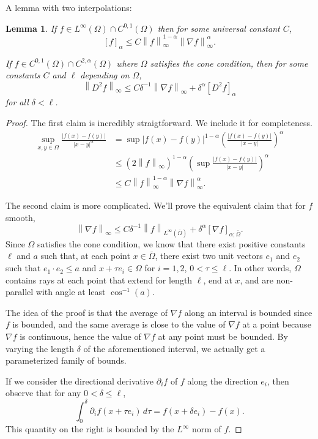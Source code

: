 \documentclass[11pt]{amsart}
\newtheorem{lemma}[theorem]{Lemma}
\theoremstyle{remark}
\theoremstyle{definition}
\newcommand{\norm}[1]{\left\lVert#1\right\rVert}
\newcommand{\paren}[1]{\left( #1 \right)}
\newcommand{\bracket}[1]{\left[ #1 \right]}
\newcommand{\del}{\partial}
\newcommand{\grad}{\nabla}
\newcommand{\n}{^{-1}}
\begin{document}
A lemma with two interpolations:
\begin{lemma} \label{thm:Holder interpolation}
If $f \in L^\infty(\Omega) \cap C^{0,1}(\Omega)$ then for some universal constant $C$,
\[ \bracket{f}_\alpha \leq C \norm{f}_\infty^{1-\alpha} \norm{\grad f}_\infty^\alpha. \]

If $f \in C^{0,1}(\Omega) \cap C^{2,\alpha}(\Omega)$ where $\Omega$ satisfies the cone condition, then for some constants $C$ and $\ell$ depending on $\Omega$,
\[ \norm{D^2 f}_\infty \leq C \delta\n \norm{\grad f}_\infty  + \delta^\alpha \bracket{D^2 f}_\alpha\]
for all $\delta < \ell$.  
\end{lemma}
\begin{proof}
The first claim is incredibly straigtforward.  We include it for completeness.  
\begin{align*} 
\sup_{x,y \in \Omega} \frac{|f(x)-f(y)|}{|x-y|^\alpha} &= \sup |f(x)-f(y)|^{1-\alpha} \paren{\frac{|f(x)-f(y)|}{|x-y|}}^\alpha 
\\ &\leq \paren{2 \norm{f}_\infty}^{1-\alpha} \paren{ \sup \frac{|f(x)-f(y)|}{|x-y|} }^\alpha
\\ &\leq C \norm{f}_\infty^{1-\alpha} \norm{\grad f}_\infty^\alpha.
\end{align*}

The second claim is more complicated.  We'll prove the equivalent claim that for $f$ smooth,
\[ \norm{\grad f}_\infty \leq C \delta\n \norm{f}_{L^\infty(\bar{\Omega})} + \delta^\alpha \bracket{\grad f}_{\alpha;\bar{\Omega}}.\]
Since $\Omega$ satisfies the cone condition, we know that there exist positive constants $\ell$ and $a$ such that, at each point $x \in \bar{\Omega}$, there exist two unit vectors $e_1$ and $e_2$ such that $e_1\cdot e_2 \leq a$ and $x + \tau e_i \in \Omega$ for $i=1,2$, $0 < \tau \leq \ell$.  In other words, $\Omega$ contains rays at each point that extend for length $\ell$, end at $x$, and are non-parallel with angle at least $\cos\n(a)$.  

The idea of the proof is that the average of $\grad f$ along an interval is bounded since $f$ is bounded, and the same average is close to the value of $\grad f$ at a point because $\grad f$ is continuous, hence the value of $\grad f$ at any point must be bounded.  By varying the length $\delta$ of the aforementioned interval, we actually get a parameterized family of bounds.  

If we consider the directional derivative $\del_i f$ of $f$ along the direction $e_i$, then observe that for any $0 < \delta \leq \ell$,
\[ \int_0^\delta \del_i f(x + \tau e_i) \,d\tau = f(x+\delta e_i) - f(x). \]
This quantity on the right is bounded by the $L^\infty$ norm of $f$.  


\end{proof}
\end{document}
